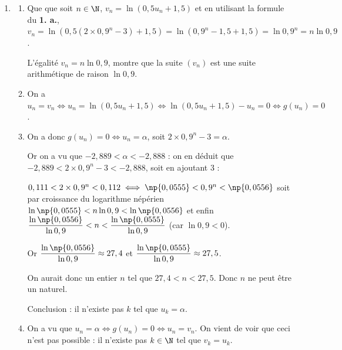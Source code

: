 \begin{enumerate}
\begin{enumerate}
$g(-2,89) \approx \np{-0,01}$ et $g(-2,88) \approx 0,067$, d'où $-2,89 < \alpha < -2,88$ ;

$g(-2,889) \approx \np{-0,002}$ et $g(-2,888) \approx 0,006$, d'où $-2,889 < \alpha < -2,888$.
	\end{enumerate}
\item 
	\begin{enumerate}
		\item Que que soit $n \in \N$, \: $v_n = \ln \left(0,5 u_n + 1,5\right)$ et en utilisant la formule du \textbf{1. a.}, $v_n = \ln \left(0,5 \left(2 \times 0,9^n - 3\right) + 1,5\right) = \ln \left(0,9^n - 1,5 + 1,5\right) = \ln 0,9^n = n \ln 0,9$.

L'égalité $v_n = n \ln 0,9$, montre que la suite $\left(v_n\right)$ est une suite arithmétique  de raison $\ln 0,9$.
		\item On a $u_n = v_n \iff u_n = \ln \left(0,5 u_n + 1,5\right) \iff \ln \left(0,5 u_n + 1,5\right) - u_n = 0 \iff g\left(u_n\right) = 0$.
		\item On a donc $g\left(u_n\right) = 0 \iff u_n = \alpha$, soit $2 \times 0,9^n - 3 = \alpha$.
		
Or on a vu que  $-2,889 < \alpha < -2,888$  : on en déduit que $-2,889 < 2 \times 0,9^n - 3 < -2,888$, soit en ajoutant 3 :

$0,111 < 2 \times 0,9^n < 0,112 \iff \np{0,0555} < 0,9^n < \np{0,0556}$ soit par croissance du logarithme népérien $\ln \np{0,0555} < n \ln 0,9 < \ln \np{0,0556}$ et enfin 
$\dfrac{\ln \np{0,0556}}{\ln 0,9}< n < \dfrac{\ln \np{0,0555}}{\ln 0,9}$ (car $\ln 0,9 < 0$).

Or $\dfrac{\ln \np{0,0556}}{\ln 0,9} \approx 27,4$ et $\dfrac{\ln \np{0,0555}}{\ln 0,9} \approx 27,5$.

On aurait donc un entier $n$ tel que $27,4 < n < 27,5$. Donc $n$ ne peut être un naturel.

Conclusion : il n'existe pas $k$ tel que $u_k = \alpha$.
\item On a vu que $u_n = \alpha \iff g\left(u_n\right) = 0 \iff u_n = v_n$. On vient de voir que ceci n'est pas possible : il n'existe pas $k \in \N$ tel que $v_k = u_k$.
	\end{enumerate}
\end{enumerate}
